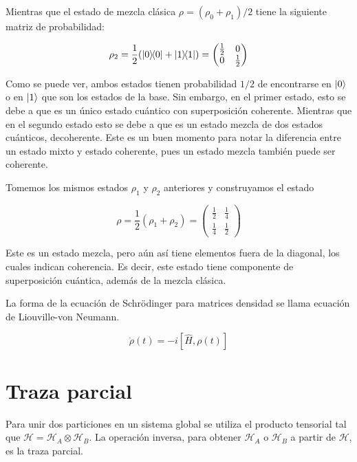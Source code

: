 Mientras que el estado de mezcla clásica $\rho = (\rho_0 + \rho_1)/2$ tiene la siguiente matriz de probabilidad:

\begin{equation}
    \rho_2 = \frac{1}{2} (\ketbra{0}{0} + \ketbra{1}{1}) =
    \begin{pmatrix}
        \frac{1}{2} & 0 \\
        0 & \frac{1}{2}
    \end{pmatrix}
\end{equation}

Como se puede ver, ambos estados tienen probabilidad $1/2$ de encontrarse en $\ket{0}$ o en $\ket{1}$ que son los estados de la base. Sin embargo, en el primer estado, esto se debe a que es un único estado cuántico con superposición coherente. Mientras que en el segundo estado esto se debe a que es un estado mezcla de dos estados cuánticos, decoherente. Este es un buen momento para notar la diferencia entre un estado mixto y estado coherente, pues un estado mezcla también puede ser coherente.

Tomemos los mismos estados $\rho_1$ y $\rho_2$ anteriores y construyamos el estado

\begin{equation}
    \rho = \frac{1}{2} (\rho_1 + \rho_2) =
    \begin{pmatrix}
        \frac{1}{2} & \frac{1}{4} \\
        \frac{1}{4} & \frac{1}{2}
    \end{pmatrix}
\end{equation}

Este es un estado mezcla, pero aún así tiene elementos fuera de la diagonal, los cuales indican coherencia. Es decir, este estado tiene componente de superposición cuántica, además de la mezcla clásica.

La forma de la ecuación de Schrödinger para matrices densidad se llama ecuación de Liouville-von Neumann.

\begin{equation}
    \dot{\rho}(t) = -i [\hat{H}, \rho(t)]
\end{equation}

\section{Traza parcial}

Para unir dos particiones en un sistema global se utiliza el producto tensorial tal que $\mathcal{H} = \mathcal{H}_A \otimes \mathcal{H}_B$. La operación inversa, para obtener $\mathcal{H}_A$ o $\mathcal{H}_B$ a partir de $\mathcal{H}$, es la traza parcial.

